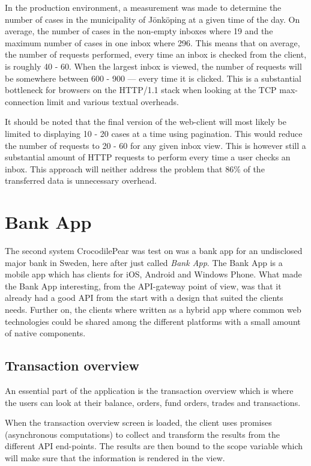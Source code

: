 \documentclass{cslthse-msc}
\begin{document}
In the production environment, a measurement was made to determine the number of cases in the municipality of Jönköping at a given time of the day. On average, the number of cases in the non-empty inboxes where 19 and the maximum number of cases in one inbox where 296. This means that on average, the number of requests performed, every time an inbox is checked from the client, is roughly 40 - 60. When the largest inbox is viewed, the number of requests will be somewhere between 600 - 900 --- every time it is clicked. This is a substantial bottleneck for browsers on the HTTP/1.1 stack when looking at the TCP max-connection limit and various textual overheads.

It should be noted that the final version of the web-client will most likely be limited to displaying 10 - 20 cases at a time using pagination. This would reduce the number of requests to 20 - 60 for any given inbox view. This is however still a substantial amount of HTTP requests to perform every time a user checks an inbox. This approach will neither address the problem that 86\% of the transferred data is unnecessary overhead.

\newpage
\section{Bank App}
The second system CrocodilePear was test on was a bank app for an undisclosed major bank in Sweden, here after just called \textit{Bank App}. The Bank App is a mobile app which has clients for iOS, Android and Windows Phone. What made the Bank App interesting, from the API-gateway point of view, was that it already had a good API from the start with a design that suited the clients needs. Further on, the clients where written as a hybrid app where common web technologies could be shared among the different platforms with a small amount of native components.

\subsection{Transaction overview}
An essential part of the application is the transaction overview which is where the users can look at their balance, orders, fund orders, trades and transactions.

When the transaction overview screen is loaded, the client uses promises (asynchronous computations) to collect and transform the results from the different API end-points. The results are then bound to the scope variable which will make sure that the information is rendered in the view.
\end{document}
